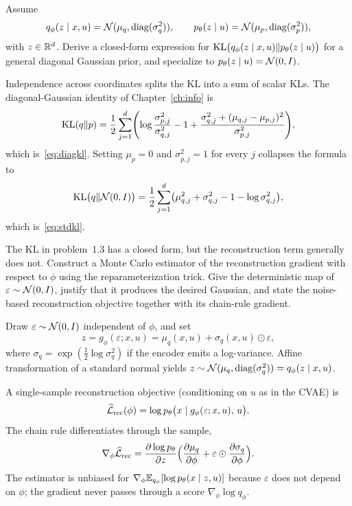 \begin{hwqbox}
Assume
\[
q_\phi(z\mid x,u)=\mathcal{N}(\mu_q,\operatorname{diag}(\sigma_q^2)),\qquad
p_\theta(z\mid u)=\mathcal{N}(\mu_p,\operatorname{diag}(\sigma_p^2)),
\]
with $z\in\mathbb{R}^d$. Derive a closed-form expression for
$\mathrm{KL}\bigl(q_\phi(z\mid x,u)\Vert p_\theta(z\mid u)\bigr)$
for a general diagonal Gaussian prior, and specialize to
$p_\theta(z\mid u)=\mathcal{N}(0,I)$.
\end{hwqbox}
\begin{hwsolbox}
Independence across coordinates splits the KL into a sum of scalar KLs. The diagonal-Gaussian identity of Chapter~\ref{ch:info} is
\begin{equation*}
\mathrm{KL}(q\Vert p)
=\frac12\sum_{j=1}^{d}
\Biggl(
\log\frac{\sigma_{p,j}^2}{\sigma_{q,j}^2}
-1
+\frac{\sigma_{q,j}^2+(\mu_{q,j}-\mu_{p,j})^2}{\sigma_{p,j}^2}
\Biggr),
\end{equation*}
which is~\eqref{eq:diagkl}. Setting $\mu_p=0$ and $\sigma_{p,j}^2=1$ for every $j$ collapses the formula to
\[
\mathrm{KL}\bigl(q\Vert\mathcal{N}(0,I)\bigr)
=\frac12\sum_{j=1}^{d}\bigl(\mu_{q,j}^2+\sigma_{q,j}^2-1-\log\sigma_{q,j}^2\bigr),
\]
which is~\eqref{eq:stdkl}.
\end{hwsolbox}

\begin{hwqbox}
The KL in problem~1.3 has a closed form, but the reconstruction term generally does not. Construct a Monte Carlo estimator of the reconstruction gradient with respect to $\phi$ using the reparameterization trick. Give the deterministic map of $\varepsilon\sim\mathcal{N}(0,I)$, justify that it produces the desired Gaussian, and state the noise-based reconstruction objective together with its chain-rule gradient.
\end{hwqbox}
\begin{hwsolbox}
Draw $\varepsilon\sim\mathcal{N}(0,I)$ independent of $\phi$, and set
\[
z=g_\phi(\varepsilon;x,u)=\mu_q(x,u)+\sigma_q(x,u)\odot\varepsilon,
\]
where $\sigma_q=\exp(\tfrac12\log\sigma_q^2)$ if the encoder emits a log-variance. Affine transformation of a standard normal yields
$z\sim\mathcal{N}(\mu_q,\operatorname{diag}(\sigma_q^2))=q_\phi(z\mid x,u)$.

A single-sample reconstruction objective (conditioning on $u$ as in the CVAE) is
\[
\widehat{\mathcal L}_{\mathrm{rec}}(\phi)
=\log p_\theta\bigl(x\mid g_\phi(\varepsilon;x,u),\,u\bigr).
\]
The chain rule differentiates through the sample,
\[
\nabla_\phi\widehat{\mathcal L}_{\mathrm{rec}}
=\frac{\partial\log p_\theta}{\partial z}
\Bigl(
\frac{\partial\mu_q}{\partial\phi}
+\varepsilon\odot\frac{\partial\sigma_q}{\partial\phi}
\Bigr).
\]
The estimator is unbiased for $\nabla_\phi\mathbb{E}_{q_\phi}[\log p_\theta(x\mid z,u)]$ because $\varepsilon$ does not depend on $\phi$; the gradient never passes through a score $\nabla_\phi\log q_\phi$.
\end{hwsolbox}
